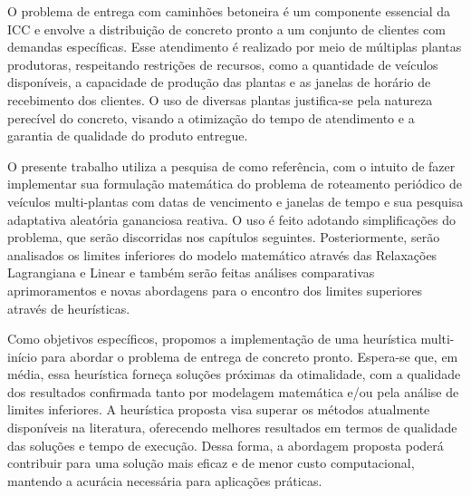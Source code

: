 O problema de entrega com caminhões betoneira é um componente essencial da ICC e envolve a distribuição de concreto pronto a um conjunto de clientes com demandas específicas. Esse atendimento é realizado por meio de múltiplas plantas produtoras, respeitando restrições de recursos, como a quantidade de veículos disponíveis, a capacidade de produção das plantas e as janelas de horário de recebimento dos clientes. O uso de diversas plantas justifica-se pela natureza perecível do concreto, visando a otimização do tempo de atendimento e a garantia de qualidade do produto entregue.


O presente trabalho utiliza a pesquisa de \cite{cantu} como referência, com o intuito de fazer implementar sua formulação matemática do problema de roteamento periódico de veículos multi-plantas com datas de vencimento e janelas de tempo e sua pesquisa adaptativa aleatória gananciosa reativa. O uso é feito adotando  simplificações do problema, que serão discorridas nos capítulos seguintes. Posteriormente, serão analisados os limites inferiores do modelo matemático através das Relaxações Lagrangiana e Linear e também serão feitas análises comparativas aprimoramentos e novas abordagens para o encontro dos limites superiores através de heurísticas.



% 
Como objetivos específicos, propomos a implementação de uma heurística multi-início para abordar o problema de entrega de concreto pronto. Espera-se que, em média, essa heurística forneça soluções próximas da otimalidade, com a qualidade dos resultados confirmada tanto por modelagem matemática e/ou pela análise de limites inferiores. A heurística proposta visa superar os métodos atualmente disponíveis na literatura, oferecendo melhores resultados em termos de qualidade das soluções e tempo de execução. Dessa forma, a abordagem proposta poderá contribuir para uma solução mais eficaz e de menor custo computacional, mantendo a acurácia necessária para aplicações práticas.

